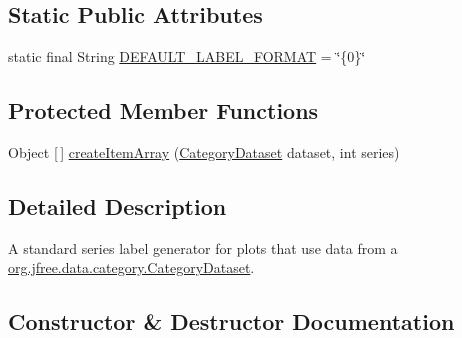 \subsection*{Static Public Attributes}
\begin{DoxyCompactItemize}
\item 
static final String \mbox{\hyperlink{classorg_1_1jfree_1_1chart_1_1labels_1_1_standard_category_series_label_generator_a9818040565d02daadc9c132d96df8816}{D\+E\+F\+A\+U\+L\+T\+\_\+\+L\+A\+B\+E\+L\+\_\+\+F\+O\+R\+M\+AT}} = \char`\"{}\{0\}\char`\"{}
\end{DoxyCompactItemize}
\subsection*{Protected Member Functions}
\begin{DoxyCompactItemize}
\item 
Object \mbox{[}$\,$\mbox{]} \mbox{\hyperlink{classorg_1_1jfree_1_1chart_1_1labels_1_1_standard_category_series_label_generator_a729b7aedf7ebcb44ee27b7323b1d6767}{create\+Item\+Array}} (\mbox{\hyperlink{interfaceorg_1_1jfree_1_1data_1_1category_1_1_category_dataset}{Category\+Dataset}} dataset, int series)
\end{DoxyCompactItemize}


\subsection{Detailed Description}
A standard series label generator for plots that use data from a \mbox{\hyperlink{interfaceorg_1_1jfree_1_1data_1_1category_1_1_category_dataset}{org.\+jfree.\+data.\+category.\+Category\+Dataset}}. 

\subsection{Constructor \& Destructor Documentation}
\mbox{\label{classorg_1_1jfree_1_1chart_1_1labels_1_1_standard_category_series_label_generator_a245519fbd17ba41d42bad8f73639d0ca}} 
